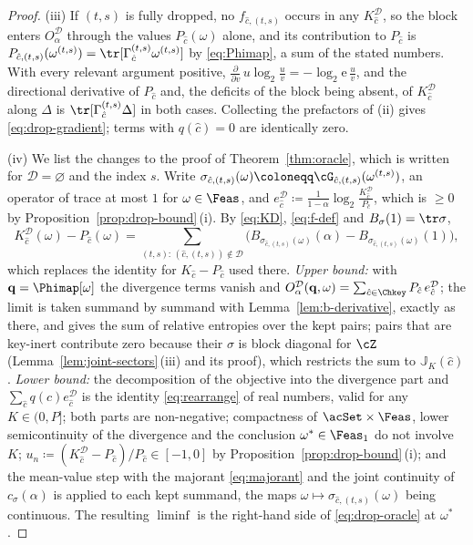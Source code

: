 \begin{proof}
(iii) If $(t,s)$ is fully dropped, no $f_{\hat c,(t,s)}$ occurs in any
$K^{\mathcal{D}}_{\hat c}$, so the block enters
$O^{\mathcal{D}}_{\alpha}$ through the values $P_{\hat c}(\omega)$ alone,
and its contribution to $P_{\hat c}$ is
$P_{\hat c,(t,s)}(\omega^{(t,s)})
=\tr[\Gamma^{(t,s)}_{\hat c}\omega^{(t,s)}]$ by \eqref{eq:Phimap}, a sum of
the stated numbers. With every relevant argument positive,
$\frac{\partial}{\partial v}\,u\log_2\frac uv=-\log_2\!\mathrm{e}\,\frac uv$,
and the directional derivative of $P_{\hat c}$ and, the deficits of the
block being absent, of $K^{\mathcal{D}}_{\hat c}$ along $\Delta$ is
$\tr[\Gamma^{(t,s)}_{\hat c}\Delta]$ in both cases. Collecting the prefactors
of (ii) gives \eqref{eq:drop-gradient}; terms with $q(\hat c)=0$ are
identically zero.

(iv) We list the changes to the proof of Theorem~\ref{thm:oracle}, which is
written for $\mathcal{D}=\varnothing$ and the index $s$. Write
$\sigma_{\hat c,(t,s)}(\omega)\coloneqq\cG_{\hat c,(t,s)}(\omega^{(t,s)})$,
an operator of trace at most $1$ for $\omega\in\Feas$, and
$e^{\mathcal{D}}_{\hat c}\coloneqq\frac{1}{1-\alpha}\log_2
\frac{K^{\mathcal{D}}_{\hat c}}{P_{\hat c}}$, which is $\ge0$ by
Proposition~\ref{prop:drop-bound}\,(i). By \eqref{eq:KD}, \eqref{eq:f-def}
and $B_{\sigma}(1)=\tr\sigma$,
\begin{equation*}
  K^{\mathcal{D}}_{\hat c}(\omega)-P_{\hat c}(\omega)
  =\sum_{(t,s):\,(\hat c,(t,s))\notin\mathcal{D}}
  \Big(B_{\sigma_{\hat c,(t,s)}(\omega)}(\alpha)
  -B_{\sigma_{\hat c,(t,s)}(\omega)}(1)\Big),
\end{equation*}
which replaces the identity for $K_{\hat c}-P_{\hat c}$ used there.
\emph{Upper bound:} with $\mathbf q=\Phimap[\omega]$ the divergence terms
vanish and $O^{\mathcal{D}}_{\alpha}(\mathbf q,\omega)
=\sum_{\hat c\in\Chkey}P_{\hat c}\,e^{\mathcal{D}}_{\hat c}$; the limit is
taken summand by summand with Lemma~\ref{lem:b-derivative}, exactly as there,
and gives the sum of relative entropies over the kept pairs; pairs that are
key-inert contribute zero because their $\sigma$ is block diagonal for
$\cZ$ (Lemma~\ref{lem:joint-sectors}\,(iii) and its proof), which restricts
the sum to $\mathbb{J}_K(\hat c)$. \emph{Lower bound:} the decomposition of
the objective into the divergence part and
$\sum_{\hat c}q(\hat c)e^{\mathcal{D}}_{\hat c}$ is the identity
\eqref{eq:rearrange} of real numbers, valid for any $K\in(0,P]$; both parts
are non-negative; compactness of $\acSet\times\Feas$, lower semicontinuity of
the divergence and the conclusion $\omega^{*}\in\Feas_1$ do not involve $K$;
$u_n\coloneqq(K^{\mathcal{D}}_{\hat c}-P_{\hat c})/P_{\hat c}\in[-1,0]$ by
Proposition~\ref{prop:drop-bound}\,(i); and the mean-value step with the
majorant \eqref{eq:majorant} and the joint continuity of $c_{\sigma}(\alpha)$
is applied to each kept summand, the maps
$\omega\mapsto\sigma_{\hat c,(t,s)}(\omega)$ being continuous. The resulting
$\liminf$ is the right-hand side of \eqref{eq:drop-oracle} at $\omega^{*}$.
\end{proof}
